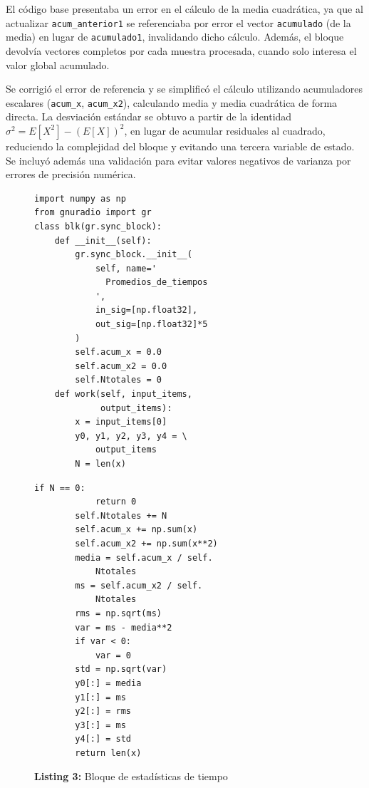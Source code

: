 \documentclass[twocolumn]{IEEEtran}
\begin{document}
El código base presentaba un error en el cálculo de la media cuadrática, ya que al 
actualizar \texttt{acum\_anterior1} se referenciaba por error el vector 
\texttt{acumulado} (de la media) en lugar de \texttt{acumulado1}, invalidando dicho 
cálculo. Además, el bloque devolvía vectores completos por cada muestra procesada, 
cuando solo interesa el valor global acumulado.

Se corrigió el error de referencia y se simplificó el cálculo utilizando 
acumuladores escalares (\texttt{acum\_x}, \texttt{acum\_x2}), calculando media y 
media cuadrática de forma directa. La desviación estándar se obtuvo a partir de la 
identidad $\sigma^2 = E[X^2] - (E[X])^2$, en lugar de acumular residuales al 
cuadrado, reduciendo la complejidad del bloque y evitando una tercera variable de 
estado. Se incluyó además una validación para evitar valores negativos de varianza 
por errores de precisión numérica.


\begin{figure}[t]
\centering
\begin{minipage}[t]{0.48\linewidth}
\begin{lstlisting}[basicstyle=\tiny\ttfamily, firstnumber=1]
import numpy as np
from gnuradio import gr
class blk(gr.sync_block):
    def __init__(self):
        gr.sync_block.__init__(
            self, name='
              Promedios_de_tiempos
            ',
            in_sig=[np.float32],
            out_sig=[np.float32]*5
        )
        self.acum_x = 0.0
        self.acum_x2 = 0.0
        self.Ntotales = 0
    def work(self, input_items,
             output_items):
        x = input_items[0]
        y0, y1, y2, y3, y4 = \
            output_items
        N = len(x)
\end{lstlisting}
\end{minipage}
\hfill
\begin{minipage}[t]{0.48\linewidth}
\begin{lstlisting}[basicstyle=\tiny\ttfamily, firstnumber=21]
        if N == 0:
            return 0
        self.Ntotales += N
        self.acum_x += np.sum(x)
        self.acum_x2 += np.sum(x**2)
        media = self.acum_x / self.
            Ntotales
        ms = self.acum_x2 / self.
            Ntotales
        rms = np.sqrt(ms)
        var = ms - media**2
        if var < 0:
            var = 0
        std = np.sqrt(var)
        y0[:] = media
        y1[:] = ms
        y2[:] = rms
        y3[:] = ms
        y4[:] = std
        return len(x)
\end{lstlisting}
\end{minipage}
\caption*{\textbf{Listing 3:} Bloque de estadísticas de tiempo}
\label{lst:estadisticas}
\end{figure}
\end{document}
